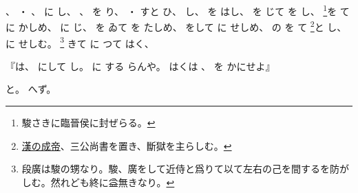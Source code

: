 \documentclass[a4paper,12pt]{article}
\begin{document}
%
%
、%
・%
、%
に%
し、%
、%
を%
り、%
・%
すと%
ひ、%
%
し、%
を%
はし、%
を%
じて%
を%
し、%
\footnote{駿さきに臨晉侯に封ぜらる。}を%
て%
に%
かしめ、%
%
に%
じ、%
%
を%
ゐて%
を%
たしめ、%
%
をして%
に%
せしめ、%
の%
%
を%
て%
\footnote{\href{https://kotobank.jp/word/\%E6\%88\%90\%E5\%B8\%9D\%28\%E4\%B8\%AD\%E5\%9B\%BD\%E3\%80\%81\%E5\%89\%8D\%E6\%BC\%A2\%29-1553617\#E6.97.A5.E6.9C.AC.E5.A4.A7.E7.99.BE.E7.A7.91.E5.85.A8.E6.9B.B8.28.E3.83.8B.E3.83.83.E3.83.9D.E3.83.8B.E3.82.AB.29}{漢の成帝}、三公尚書を置き、斷獄を主らしむ。}と%
し、%
に%
せしむ。%
\footnote{段廣は駿の甥なり。駿、廣をして近侍と爲りて以て左右の己を間するを防がしむ。然れども終に益無きなり。}%
きて%
に%
つて%
はく、%
\begin{quoting}
『は、%
にして%
%
し。%
に%
する%
%
らんや。%
はくは%
、%
を%
かにせよ』
\end{quoting}
と。%
%
へず。%
\end{document}
